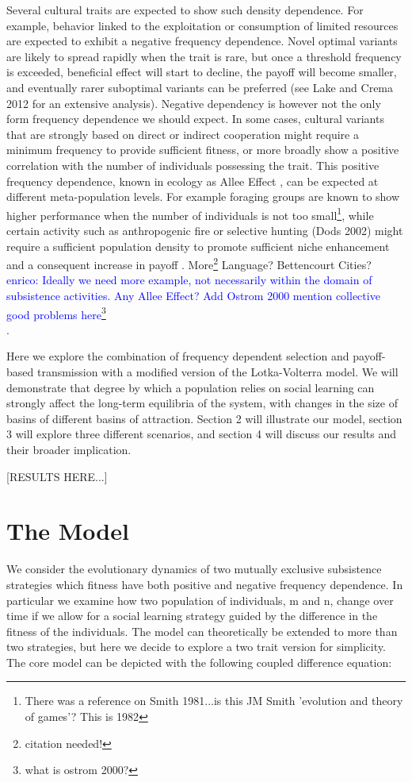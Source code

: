 \documentclass[preprint,authoryear]{elsarticle}
\newcommand{\memo}[2]{\textcolor{#1}{#2}}
\newcommand{\enrico}[1]{\memo{blue}{enrico: #1\\}}
\begin{document}
Several cultural traits are expected to show such density dependence. For example, behavior linked to the exploitation or consumption of limited resources are expected to exhibit a negative frequency dependence. Novel optimal variants are likely to spread rapidly when the trait is rare, but once a threshold frequency is exceeded,  beneficial effect will start to decline, the payoff will become smaller, and eventually rarer suboptimal variants can be preferred (see Lake and Crema 2012 for an extensive analysis). Negative dependency is however not the only form frequency dependence we should expect. In some cases, cultural variants that are strongly based on direct or indirect cooperation might require a minimum frequency to provide sufficient fitness, or more broadly show a positive correlation with the number of individuals possessing the trait. This positive frequency dependence, known in ecology as Allee Effect \citep{allee1958}, can be expected at different meta-population levels. For example foraging groups are known to show higher performance when the number of individuals is not too small\footnote{There was a reference on Smith 1981...is this JM Smith 'evolution and theory of games'? This is 1982}, while certain activity such as anthropogenic fire \citep{bird2013} or selective hunting (Dods 2002) might require a sufficient population density to promote sufficient niche enhancement and a consequent increase in payoff \citep{rowley2011}. More\footnote{citation needed!} Language? Bettencourt Cities? \enrico{Ideally we need more example, not necessarily within the domain of subsistence activities. Any Allee Effect? Add Ostrom 2000 mention collective good problems here\footnote{what is ostrom 2000?}}.

Here we explore the combination of frequency dependent selection and payoff-based transmission with a modified version of the Lotka-Volterra model. We will demonstrate that degree by which a population relies on social learning can strongly affect the long-term equilibria of the system, with changes in the size of basins of different basins of attraction. Section 2 will illustrate our model, section 3 will explore three different scenarios, and section 4 will discuss our results and their broader implication. 

[RESULTS HERE...]

\section{The Model}
We consider the evolutionary dynamics of two mutually exclusive subsistence strategies which fitness have both positive and negative frequency dependence. In particular we examine how two population of individuals, m and n, change over time if we allow for a social learning strategy guided by the difference in the fitness of the individuals. The model can theoretically be extended to more than two strategies, but here we decide to explore a two trait version for simplicity. The core model can be depicted with the following coupled difference equation:
\end{document}
